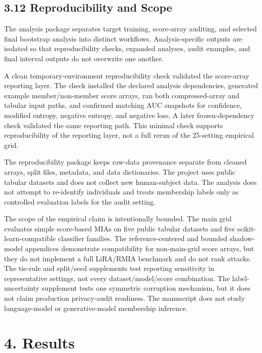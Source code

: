 \documentclass[
  10pt,
  twocolumn]{article}
\begin{document}
\hypertarget{reproducibility-and-scope}{%
\subsection{3.12 Reproducibility and Scope}\label{reproducibility-and-scope}}

The analysis package separates target training, score-array auditing, and selected final bootstrap analysis into distinct workflows. Analysis-specific outputs are isolated so that reproducibility checks, expanded analyses, audit examples, and final interval outputs do not overwrite one another.

A clean temporary-environment reproducibility check validated the score-array reporting layer. The check installed the declared analysis dependencies, generated example member/non-member score arrays, ran both compressed-array and tabular input paths, and confirmed matching AUC snapshots for confidence, modified entropy, negative entropy, and negative loss. A later frozen-dependency check validated the same reporting path. This minimal check supports reproducibility of the reporting layer, not a full rerun of the 25-setting empirical grid.

The reproducibility package keeps raw-data provenance separate from cleaned arrays, split files, metadata, and data dictionaries. The project uses public tabular datasets and does not collect new human-subject data. The analysis does not attempt to re-identify individuals and treats membership labels only as controlled evaluation labels for the audit setting.

The scope of the empirical claim is intentionally bounded. The main grid evaluates simple score-based MIAs on five public tabular datasets and five scikit-learn-compatible classifier families. The reference-centered and bounded shadow-model appendices demonstrate compatibility for non-main-grid score arrays, but they do not implement a full LiRA/RMIA benchmark and do not rank attacks. The tie-rule and split/seed supplements test reporting sensitivity in representative settings, not every dataset/model/score combination. The label-uncertainty supplement tests one symmetric corruption mechanism, but it does not claim production privacy-audit readiness. The manuscript does not study language-model or generative-model membership inference.

\hypertarget{results}{%
\section{4. Results}\label{results}}
\end{document}
